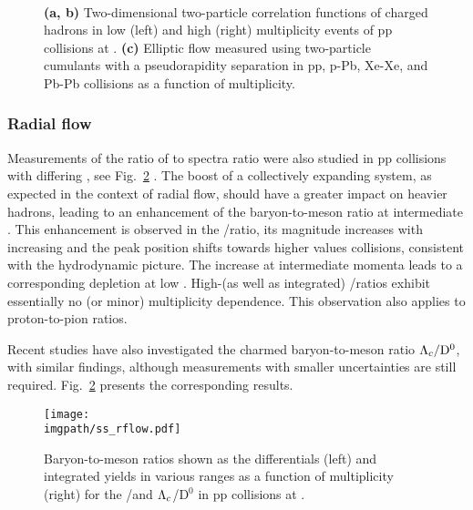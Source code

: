 \begin{figure}[H]
\\
\caption{\textbf{(a, b)} Two-dimensional two-particle correlation functions of charged hadrons in low (left) and high (right) multiplicity events of pp collisions at . \cite{cmscollaborationEvidenceCollectivityPp2017} \textbf{(c)} Elliptic flow measured using two-particle cumulants with a pseudorapidity separation in pp, p-Pb, Xe-Xe, and Pb-Pb collisions as a function of multiplicity. \cite{alicecollaborationInvestigationsAnisotropicFlow2019}}
\label{fig:colls:ssv2}
\end{figure}

\subsubsection*{Radial flow}

Measurements of the ratio of \LA to \KOs \pt spectra ratio were also studied in pp collisions with differing \Nch, see Fig.~\ref{fig:colls:ssrflow} \cite{alicecollaborationMultiplicityDependenceMulti2020}. The boost of a collectively expanding system, as expected in the context of radial flow, should have a greater impact on heavier hadrons, leading to an enhancement of the baryon-to-meson ratio at intermediate \pt. This enhancement is observed in the \LA/\KOs ratio, its magnitude increases with increasing \Nch and the peak position shifts towards higher values collisions, consistent with the hydrodynamic picture. The increase at intermediate momenta leads to a corresponding depletion at low \pt. High-\pt (as well as integrated) \LA/\KOs ratios exhibit essentially no (or minor) multiplicity dependence. This observation also applies to proton-to-pion ratios. 

Recent studies have also investigated the charmed baryon-to-meson ratio $\Lambda_c/\mathrm{D^0}$, with similar findings, although measurements with smaller uncertainties are still required. Fig.~\ref{fig:colls:ssrflow} presents the corresponding results.

\begin{figure}[H]
\texttt{[image: \\imgpath/ss\_rflow.pdf]}
\caption{Baryon-to-meson ratios shown as the \pt differentials (left) and integrated yields in various \pt ranges as a function of multiplicity (right) for the \LA/\KOs and $\Lambda_c$/$\mathrm{D^0}$ in pp collisions at . \cite{alicecollaborationMultiplicityDependenceMulti2020, alicecollaborationObservationMultiplicityDependence2022, alicecollaborationALICEExperimentJourney2022}}
\label{fig:colls:ssrflow}
\end{figure}

